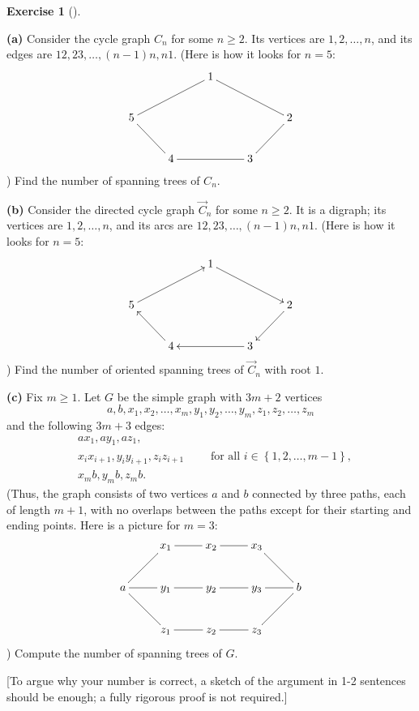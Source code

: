 \documentclass[numbers=enddot,12pt,final,onecolumn,notitlepage]{scrartcl}%
\newcounter{exer}
\theoremstyle{definition}
\newtheorem{exmp}[exer]{Exercise}
\newenvironment{exercise}[1][]
{\begin{exmp}[#1]\begin{leftbar}}
{\end{leftbar}\end{exmp}}
\newcommand{\set}[1]{\left\{ #1 \right\}}
\newcommand{\tup}[1]{\left( #1 \right)}
\begin{document}
\begin{exercise} \label{exe.hw3.countST}
\textbf{(a)} Consider the cycle graph $C_n$ for some $n \geq 2$. Its
vertices are $1, 2, \ldots, n$, and its edges are $12, 23, \ldots,
\tup{n-1}n, n1$. (Here is how it looks for $n = 5$:
\[
\xymatrix{
& & 1 \ar@{-}[rrd] \\
5 \ar@{-}[rru] \ar@{-}[rd] & & & & 2 \ar@{-}[ld] \\
& 4 \ar@{-}[rr] & & 3
}
\]
)
Find the number of spanning trees of $C_n$.

\textbf{(b)} Consider the directed cycle graph $\overrightarrow{C}_n$
for some $n \geq 2$. It is a digraph; its vertices are
$1, 2, \ldots, n$, and its arcs are $12, 23, \ldots, \tup{n-1}n, n1$.
(Here is how it looks for $n = 5$:
\[
\xymatrix{
& & 1 \ar[rrd] \\
5 \ar[rru] & & & & 2 \ar[ld] \\
& 4 \ar[lu] & & 3 \ar[ll]
}
\]
)
Find the number of oriented spanning trees of $\overrightarrow{C}_n$
with root $1$.

\textbf{(c)} Fix $m \geq 1$. Let $G$ be the simple graph with $3m+2$
vertices
\[
a, b, x_1, x_2, \ldots, x_m, y_1, y_2, \ldots, y_m, z_1, z_2, \ldots,
z_m
\]
and the following $3m+3$ edges:
\begin{align*}
& ax_1, ay_1, az_1, \\
& x_i x_{i+1}, y_i y_{i+1}, z_i z_{i+1} \qquad \text{ for all }
                i \in \set{1, 2, \ldots, m-1}, \\
& x_m b, y_m b, z_m b .
\end{align*}
(Thus, the graph consists of two vertices $a$ and $b$ connected by
three paths, each of length $m+1$, with no overlaps between the paths
except for their starting and ending points. Here is a picture for
$m = 3$:
\[
\xymatrix{
& x_1 \ar@{-}[r] & x_2 \ar@{-}[r] & x_3 \ar@{-}[dr] \\
a \ar@{-}[r] \ar@{-}[ru] \ar@{-}[rd] & y_1 \ar@{-}[r] & y_2 \ar@{-}[r] & y_3 \ar@{-}[r] & b \\
& z_1 \ar@{-}[r] & z_2 \ar@{-}[r] & z_3 \ar@{-}[ru]
}
\]
)
Compute the number of spanning trees of $G$.

[To argue why your number is correct, a sketch of the argument in 1-2
sentences should be enough; a fully rigorous proof is not required.]
\end{exercise}
\end{document}
